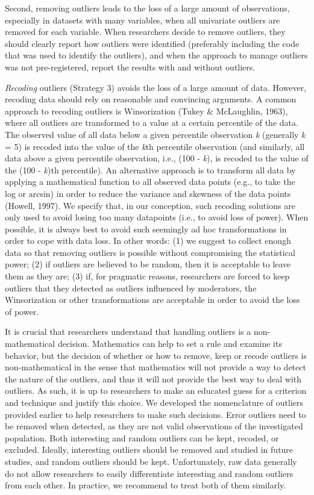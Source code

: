 \documentclass[man,floatsintext]{apa6}
\begin{document}
Second, removing outliers leads to the loss of a large amount of observations, especially in datasets with many variables, when all univariate outliers are removed for each variable. When researchers decide to remove outliers, they should clearly report how outliers were identified (preferably including the code that was used to identify the outliers), and when the approach to manage outliers was not pre-registered, report the results with and without outliers.

\emph{Recoding} outliers (Strategy 3) avoids the loss of a large amount of data. However, recoding data should rely on reasonable and convincing arguments. A common approach to recoding outliers is Winsorization (Tukey \& McLaughlin, 1963), where all outliers are transformed to a value at a certain percentile of the data. The observed value of all data below a given percentile observation \emph{k} (generally \emph{k} = 5) is recoded into the value of the \emph{k}th percentile observation (and similarly, all data above a given percentile observation, i.e., (100 - \emph{k}), is recoded to the value of the (100 - \emph{k})th percentile). An alternative approach is to transform all data by applying a mathematical function to all observed data points (e.g., to take the log or arcsin) in order to reduce the variance and skewness of the data points (Howell, 1997). We specify that, in our conception, such recoding solutions are only used to avoid losing too many datapoints (i.e., to avoid loss of power). When possible, it is always best to avoid such seemingly ad hoc transformations in order to cope with data loss. In other words: (1) we suggest to collect enough data so that removing outliers is possible without compromising the statistical power; (2) if outliers are believed to be random, then it is acceptable to leave them as they are; (3) if, for pragmatic reasons, researchers are forced to keep outliers that they detected as outliers influenced by moderators, the Winsorization or other transformations are acceptable in order to avoid the loss of power.

It is crucial that researchers understand that handling outliers is a non-mathematical decision. Mathematics can help to set a rule and examine its behavior, but the decision of whether or how to remove, keep or recode outliers is non-mathematical in the sense that mathematics will not provide a way to detect the nature of the outliers, and thus it will not provide the best way to deal with outliers. As such, it is up to researchers to make an educated guess for a criterion and technique and justify this choice. We developed the nomenclature of outliers provided earlier to help researchers to make such decisions. Error outliers need to be removed when detected, as they are not valid observations of the investigated population. Both interesting and random outliers can be kept, recoded, or excluded. Ideally, interesting outliers should be removed and studied in future studies, and random outliers should be kept. Unfortunately, raw data generally do not allow researchers to easily differentiate interesting and random outliers from each other. In practice, we recommend to treat both of them similarly.
\end{document}
